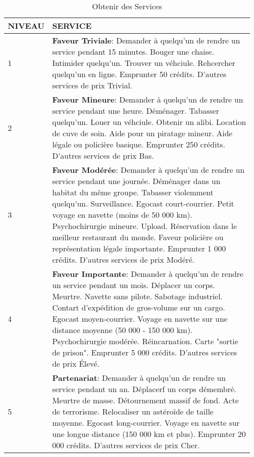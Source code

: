 \begin{table} \caption{Obtenir des Services} \begin{tabularx}{\textwidth}{|l|X|} \hline

NIVEAU &SERVICE \\ \hline

1 &\textbf{Faveur Triviale}: Demander à quelqu'un de rendre un service pendant 15 minutes. Bouger une chaise. Intimider quelqu'un. Trouver un véhciule. Rehcercher quelqu'un en ligne. Emprunter 50 crédits. D'autres services de prix Trivial. \\ \hline

2 &\textbf{Faveur Mineure}: Demander à quelqu'un de rendre un service pendant une heure. Déménager. Tabasser quelqu'un. Louer un véhciule. Obtenir un alibi. Location de cuve de soin. Aide pour un piratage mineur. Aide légale ou policière basique. Emprunter 250 crédits. D'autres services de prix Bas. \\ \hline

3 &\textbf{Faveur Modérée}: Demander à quelqu'un de rendre un service pendant une journée. Déménager dans un habitat du même groupe. Tabasser violemment quelqu'un. Surveillance. Egocast court-courrier. Petit voyage en navette (moins de 50 000 km). Psychochirurgie mineure. Upload. Réservation dans le meilleur restaurant du monde. Faveur policière ou représentation légale importante. Emprunter 1 000 crédits. D'autres services de prix Modéré. \\ \hline

4 &\textbf{Faveur Importante}: Demander à quelqu'un de rendre un service pendant un mois. Déplacer un corps. Meurtre. Navette sans pilote. Sabotage industriel. Contart d'expédition de gros-volume sur un cargo. Egocast moyen-courrier. Voyage en navette sur une distance moyenne (50 000 - 150 000 km). Psychochirurgie modérée. Réincarnation. Carte "sortie de prison". Emprunter 5 000 crédits. D'autres services de prix Élevé. \\ \hline

5 &\textbf{Partenariat}: Demander à quelqu'un de rendre un service pendant un an. Déplacerf un corps démembré. Meurtre de masse. Détournement massif de fond. Acte de terrorisme. Relocaliser un astéroïde de taille moyenne. Egocast long-courrier. Voyage en navette sur une longue distance (150 000 km et plus). Emprunter 20 000 crédits. D'autres services de prix Cher. \\ \hline

\end{tabularx} \end{table} 

